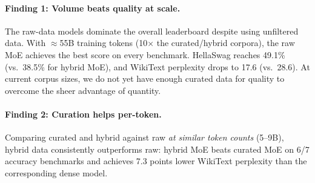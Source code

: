 \documentclass[10pt]{article}
\begin{document}
\begin{table}[H]
\centering
\caption{Group 3 results. Best per data source in \textbf{bold}; overall best \underline{underlined}.}
\label{tab:group3_results}
\small
{}
\end{table}

\paragraph{Finding 1: Volume beats quality at scale.}
The raw-data models dominate the overall leaderboard despite using unfiltered data. With ${\approx}$55B training tokens (10$\times$ the curated/hybrid corpora), the raw MoE achieves the best score on every benchmark. HellaSwag reaches 49.1\% (vs.\ 38.5\% for hybrid MoE), and WikiText perplexity drops to 17.6 (vs.\ 28.6). At current corpus sizes, we do not yet have enough curated data for quality to overcome the sheer advantage of quantity.

\paragraph{Finding 2: Curation helps per-token.}
Comparing curated and hybrid against raw \emph{at similar token counts} (5--9B), hybrid data consistently outperforms raw: hybrid MoE beats curated MoE on 6/7 accuracy benchmarks and achieves 7.3 points lower WikiText perplexity than the corresponding dense model.
\end{document}

